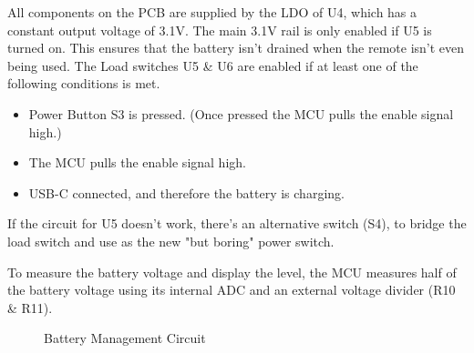 All components on the PCB are supplied by the LDO of U4, which has a constant output voltage of 3.1V. The main 3.1V rail is only enabled if U5 is turned on. This ensures that the battery isn't drained when the remote isn't even being used. The Load switches U5 \& U6 are enabled if at least one of the following conditions is met.
\begin{itemize}
    \item Power Button S3 is pressed. (Once pressed the MCU pulls the enable signal high.)
    \item The MCU pulls the enable signal high.
    \item USB-C connected, and therefore the battery is charging.
\end{itemize}
If the circuit for U5 doesn't work, there's an alternative switch (S4), to bridge the load switch and use as the new "but boring" power switch.

To measure the battery voltage and display the level, the MCU measures half of the battery voltage using its internal ADC and an external voltage divider (R10 \& R11).

\begin{figure}[H]
	\centering
	\caption{Battery Management Circuit}
	\label{fig:Battery Management Circuit}
\end{figure}